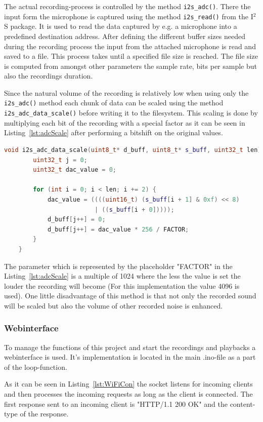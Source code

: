 The actual recording-process is controlled by the method \texttt{i2s\_adc()}.
There the input form the microphone is captured using the method \texttt{i2s\_read()} from the I$^2$S package.
It is used to read the data captured by e.g. a microphone into a predefined destination address.
After defining the different buffer sizes needed during the recording process the input from the attached microphone is read and saved to a file.
This process takes until a specified file size is reached.
The file size is computed from amongst other parameters the sample rate, bits per sample but also the recordings duration.  

Since the natural volume of the recording is relatively low when using only the \texttt{i2s\_adc()} method each chunk of data can be scaled using the method \texttt{i2s\_adc\_data\_scale()} before writing it to the filesystem.
This scaling is done by multiplying each bit of the recording with a special factor as it can be seen in Listing~\ref{lst:adcScale} after performing a bitshift on the original values.
\begin{lstlisting}[frame=single, language={c++}, style=style,
	caption={The function which is used to scale the captured recordings volume.}, label={lst:adcScale},float=!htb]	
	void i2s_adc_data_scale(uint8_t* d_buff, uint8_t* s_buff, uint32_t len) {
		uint32_t j = 0;
		uint32_t dac_value = 0;
		
		for (int i = 0; i < len; i += 2) {
			dac_value = ((((uint16_t) (s_buff[i + 1] & 0xf) << 8)
						 | ((s_buff[i + 0]))));
			d_buff[j++] = 0;
			d_buff[j++] = dac_value * 256 / FACTOR;
		}
	}	
\end{lstlisting}
The parameter which is represented by the placeholder "FACTOR" in the Listing~\ref{lst:adcScale} is a multiple of 1024 where the less the value is set the louder the recording will become (For this implementation the value 4096 is used).
One little disadvantage of this method is that not only the recorded sound will be scaled but also the volume of other recorded noise is enhanced.

\subsubsection{Webinterface}
To manage the functions of this project and start the recordings and playbacks a webinterface is used.
It's implementation is located in the main .ino-file as a part of the loop-function.

As it can be seen in Listing~\ref{lst:WiFiCon} the socket listens for incoming clients and then processes the incoming requests as long as the client is connected.
The first response sent to an incoming client is "HTTP/1.1 200 OK" and the content-type of the response.

